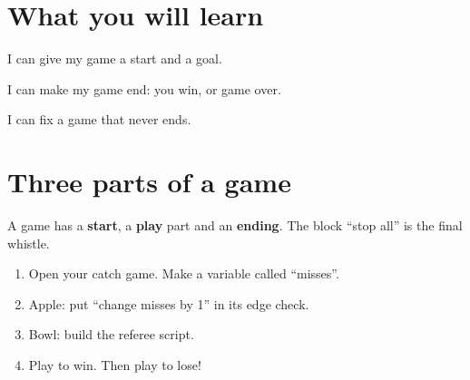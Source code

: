 
\section{What you will learn}
\begin{ican}
  \item I can give my game a start and a goal.
  \item I can make my game end: you win, or game over.
  \item I can fix a game that never ends.
\end{ican}

\section{Three parts of a game}
A game has a \textbf{start}, a \textbf{play} part and an \textbf{ending}. The block \enquote{stop all} is the final whistle.

\begin{exercise}
\begin{enumerate}[leftmargin=1.4em,itemsep=2pt]
  \item Open your catch game. Make a variable called \enquote{misses}.
  \item Apple: put \enquote{change misses by 1} in its edge check.
  \item Bowl: build the referee script.
  \item Play to win. Then play to lose!
\end{enumerate}
\begin{center}
\begin{scratch}[scale=0.8]
\end{scratch}
\end{center}
\end{exercise}

